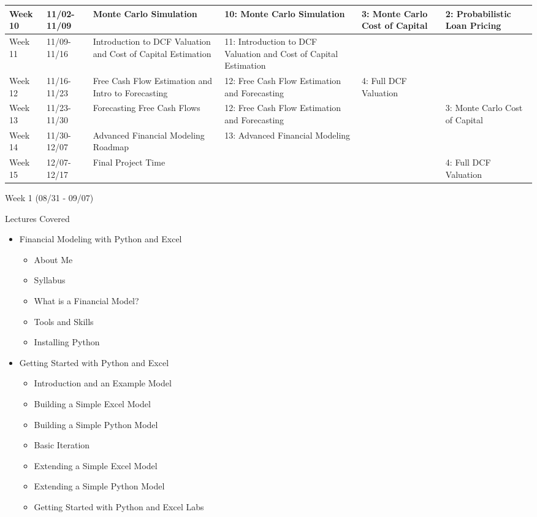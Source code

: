 \documentclass[]{article}
\begin{document}
\begin{landscape}
\begin{tabular}{L{1.3cm}lL{5cm}L{9cm}L{2.5cm}L{2.5cm}}
\hline
Week 10 & 11/02-11/09 & Monte Carlo Simulation & 10: Monte Carlo Simulation & 3: Monte Carlo Cost of Capital & 2: Probabilistic Loan Pricing\\

\hline
Week 11 & 11/09-11/16 & Introduction to DCF Valuation and Cost of Capital Estimation & 11: Introduction to DCF Valuation and Cost of Capital Estimation &  & \\

\hline
Week 12 & 11/16-11/23 & Free Cash Flow Estimation and Intro to Forecasting & 12: Free Cash Flow Estimation and Forecasting & 4: Full DCF Valuation & \\

\hline
Week 13 & 11/23-11/30 & Forecasting Free Cash Flows & 12: Free Cash Flow Estimation and Forecasting &  & 3: Monte Carlo Cost of Capital\\

\hline
Week 14 & 11/30-12/07 & Advanced Financial Modeling Roadmap & 13: Advanced Financial Modeling &  & \\

\hline
Week 15 & 12/07-12/17 & Final Project Time &  &  & 4: Full DCF Valuation\\

\bottomrule
\end{tabular}
\end{landscape}
\begin{section}{Week 1 (08/31 - 09/07)}
\begin{subsection}{Lectures Covered}
\begin{itemize}
\item Financial Modeling with Python and Excel
\begin{itemize}
\item About Me
\item Syllabus
\item What is a Financial Model?
\item Tools and Skills
\item Installing Python
\end{itemize}
\end{itemize}
\begin{itemize}
\item Getting Started with Python and Excel
\begin{itemize}
\item Introduction and an Example Model
\item Building a Simple Excel Model
\item Building a Simple Python Model
\item Basic Iteration
\item Extending a Simple Excel Model
\item Extending a Simple Python Model
\item Getting Started with Python and Excel Labs
\end{itemize}
\end{itemize}
\end{subsection}
\end{section}
\end{document}
